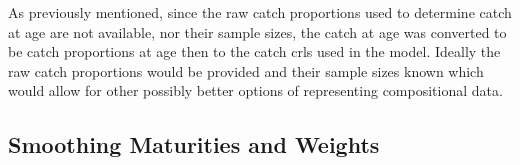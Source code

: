 \documentclass[11pt]{article}\usepackage[]{graphicx}\usepackage[]{color}
\begin{document}
As previously mentioned, since the raw catch proportions used to determine catch at age are not available, nor their sample sizes, the catch at age was converted to be catch proportions at age then to the catch \acrshort{crl}s used in the model. Ideally the raw catch proportions would be provided and their sample sizes known which would allow for other possibly better options of representing compositional data. 



\begin{table}[]
  \centering
  \caption{The periods for landing bounds provided by Danny Ings, along with the description of how they relate and three sets of different upper and lower bound multipliers to be tested on \acrshort{spam}.}
  \label{landTable}
\end{table}

\subsection{Smoothing Maturities and Weights}
\end{document}

